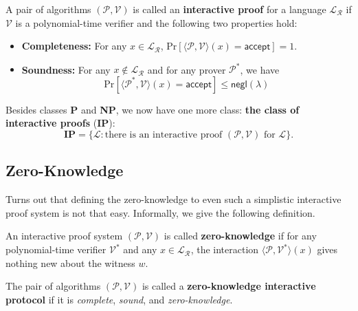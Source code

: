 \documentclass[../lecture-notes-148x210.tex]{subfiles}
\begin{document}
\begin{definition}
    A pair of algorithms $(\mathcal{P},\mathcal{V})$ is called an \textbf{interactive proof} for a language $\mathcal{L}_{\mathcal{R}}$ if $\mathcal{V}$ is a polynomial-time verifier and the following two properties hold:
    \begin{itemize}
        \item \textbf{Completeness:} For any $x \in \mathcal{L}_{\mathcal{R}}$, $\text{Pr}[\langle \mathcal{P}, \mathcal{V} \rangle(x) = \mathsf{accept}]=1$.
        \item \textbf{Soundness:} For any $x \not\in \mathcal{L}_{\mathcal{R}}$ and for any prover $\mathcal{P}^*$, we have 
        \begin{equation*}
            \text{Pr}[\langle \mathcal{P}^*, \mathcal{V} \rangle(x) = \mathsf{accept}] \leq \mathsf{negl}(\lambda)
        \end{equation*}
    \end{itemize}
\end{definition}

\begin{definition}
    Besides classes \textbf{P} and \textbf{NP}, we now have one more class: \textbf{the class of interactive proofs} (\textbf{IP}):
    \begin{equation*}
        \mathbf{IP} = \{\mathcal{L}: \text{there is an interactive proof $(\mathcal{P}, \mathcal{V})$ for $\mathcal{L}$}\}.
    \end{equation*}
\end{definition}

\subsection{Zero-Knowledge}

Turns out that defining the zero-knowledge to even such a simplistic interactive proof system is not that easy. Informally, we give the following definition.

\begin{definition}
    An interactive proof system $(\mathcal{P}, \mathcal{V})$ is called \textbf{zero-knowledge} if for any polynomial-time verifier $\mathcal{V}^*$ and any $x \in \mathcal{L}_{\mathcal{R}}$, the interaction $\langle \mathcal{P}, \mathcal{V}^* \rangle(x)$ gives nothing new about the witness $w$.
\end{definition}

\begin{definition}
    The pair of algorithms $(\mathcal{P}, \mathcal{V})$ is called a \textbf{zero-knowledge interactive protocol} if it is \textit{complete}, \textit{sound}, and \textit{zero-knowledge}.
\end{definition}
\end{document}
